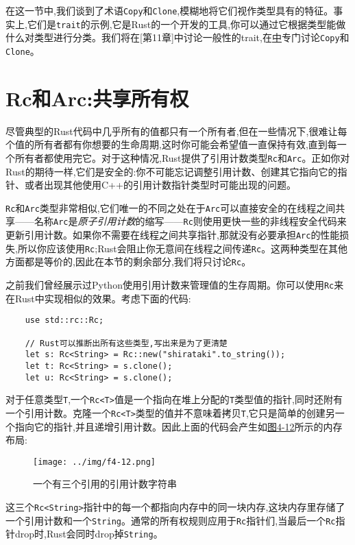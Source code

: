 在这一节中,我们谈到了术语\texttt{Copy}和\texttt{Clone},模糊地将它们视作类型具有的特征。事实上,它们是\texttt{trait}的示例,它是Rust的一个开发的工具,你可以通过它根据类型能做什么对类型进行分类。我们将在\hyperref[ch11][第11章]中讨论一般性的trait,在\hyperref[ch13]中专门讨论\texttt{Copy}和\texttt{Clone}。

\section{Rc和Arc:共享所有权}\label{rc}

尽管典型的Rust代码中几乎所有的值都只有一个所有者,但在一些情况下,很难让每个值的所有者都有你想要的生命周期,这时你可能会希望值一直保持有效,直到每一个所有者都使用完它。对于这种情况,Rust提供了引用计数类型\texttt{Rc}和\texttt{Arc}。正如你对Rust的期待一样,它们是安全的:你不可能忘记调整引用计数、创建其它指向它的指针、或者出现其他使用C++的引用计数指针类型时可能出现的问题。

\texttt{Rc}和\texttt{Arc}类型非常相似,它们唯一的不同之处在于\texttt{Arc}可以直接安全的在线程之间共享——名称\texttt{Arc}是\emph{原子引用计数}的缩写——\texttt{Rc}则使用更快一些的非线程安全代码来更新引用计数。如果你不需要在线程之间共享指针,那就没有必要承担\texttt{Arc}的性能损失,所以你应该使用\texttt{Rc};Rust会阻止你无意间在线程之间传递\texttt{Rc}。这两种类型在其他方面都是等价的,因此在本节的剩余部分,我们将只讨论\texttt{Rc}。

之前我们曾经展示过Python使用引用计数来管理值的生存周期。你可以使用\texttt{Rc}来在Rust中实现相似的效果。考虑下面的代码:
\begin{verbatim}
    use std::rc::Rc;

    // Rust可以推断出所有这些类型,写出来是为了更清楚
    let s: Rc<String> = Rc::new("shirataki".to_string());
    let t: Rc<String> = s.clone();
    let u: Rc<String> = s.clone();
\end{verbatim}

对于任意类型\texttt{T},一个\texttt{Rc<T>}值是一个指向在堆上分配的\texttt{T}类型值的指针,同时还附有一个引用计数。克隆一个\texttt{Rc<T>}类型的值并不意味着拷贝\texttt{T},它只是简单的创建另一个指向它的指针,并且递增引用计数。因此上面的代码会产生如\hyperref[f4-12]{图4-12}所示的内存布局:

\begin{figure}[htbp]
    \centering
    \texttt{[image: ../img/f4-12.png]}
    \caption{一个有三个引用的引用计数字符串}
    \label{f4-12}
\end{figure}

这三个\texttt{Rc<String>}指针中的每一个都指向内存中的同一块内存,这块内存里存储了一个引用计数和一个\texttt{String}。通常的所有权规则应用于\texttt{Rc}指针们,当最后一个\texttt{Rc}指针drop时,Rust会同时drop掉\texttt{String}。

